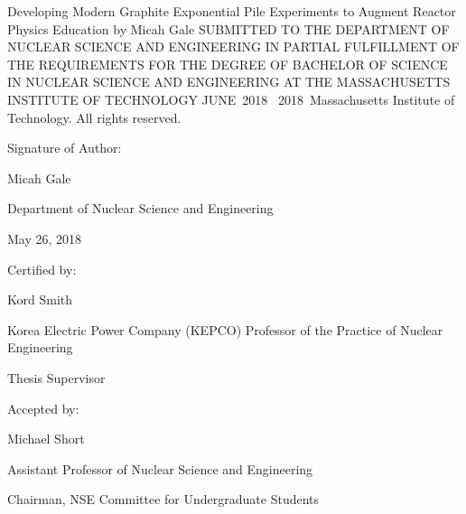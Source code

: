 \documentclass{article}
\newcommand{\thesis}{Developing Modern Graphite Exponential Pile Experiments to Augment Reactor Physics Education}
\newcommand{\me}{Micah Gale}
\newcommand{\gradMonth}{JUNE}%
\newcommand{\gradYear}{2018}
\newcommand{\signDate}{May 26, 2018}
\newcommand{\advisorName}{Kord Smith}
\newcommand{\advisorTitle}{Korea Electric Power Company (KEPCO) Professor of the Practice of Nuclear Engineering}
\newcommand{\ugChairName}{Michael Short}
\newcommand{\ugChairTitle}{Assistant Professor of Nuclear Science and Engineering}
\newcommand{\ugChairChair}{Chairman, NSE Committee for Undergraduate Students}
\newcommand{\copyStatement}{{\textcopyright \ \gradYear \ Massachusetts Institute of Technology. All rights reserved.}}
\begin{document}
\begin{titlepage}
    \begin{center}
    {\Large{\thesis}}
    \vfill
    {by}
    \vfill
    {\me}
    \vfill
    {SUBMITTED TO THE DEPARTMENT OF NUCLEAR SCIENCE AND ENGINEERING IN PARTIAL FULFILLMENT OF THE REQUIREMENTS FOR THE DEGREE OF}
    \vfill
    {BACHELOR OF SCIENCE IN NUCLEAR SCIENCE AND ENGINEERING}
    \vfill
    {AT THE}
    \vfill
    {MASSACHUSETTS INSTITUTE OF TECHNOLOGY}
    \vfill
    {\gradMonth\ \gradYear}
    \vfill
	\copyStatement
    \end{center}
    
    
    \begin{flushleft}
    {Signature of Author:\hrulefill}
    \end{flushleft}
    
    \begin{flushright}
    {\me }
    
    {Department of Nuclear Science and Engineering}
    
    {\signDate }
    \end{flushright}
    \vfill

    \begin{flushleft}
    {Certified by:\hrulefill}
    \end{flushleft}
    
    \begin{flushright}
    {\advisorName}
    
    {\advisorTitle}
    
    {Thesis Supervisor}
    
    \end{flushright}
    \vfill

\begin{flushleft}
    {Accepted by:\hrulefill}
    \end{flushleft}
    
    \begin{flushright}
	{\ugChairName}
	
	{\ugChairTitle}
	
	{\ugChairChair}
    \end{flushright}
    
\end{titlepage}
\end{document}
